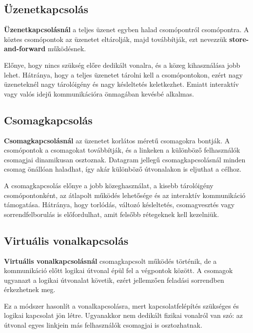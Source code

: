 \subsection{Üzenetkapcsolás}

\textbf{Üzenetkapcsolásnál} a teljes üzenet egyben halad csomópontról csomópontra. A köztes csomópontok az üzenetet eltárolják, majd továbbítják, ezt nevezzük \textbf{store-and-forward} működésnek.

Előnye, hogy nincs szükség előre dedikált vonalra, és a közeg kihasználása jobb lehet. Hátránya, hogy a teljes üzenetet tárolni kell a csomópontokon, ezért nagy üzeneteknél nagy tárolóigény és nagy késleltetés keletkezhet. Emiatt interaktív vagy valós idejű kommunikációra önmagában kevésbé alkalmas.

\subsection{Csomagkapcsolás}

\textbf{Csomagkapcsolásnál} az üzenetet korlátos méretű csomagokra bontják. A csomópontok a csomagokat továbbítják, és a linkeken a különböző felhasználók csomagjai dinamikusan osztoznak. Datagram jellegű csomagkapcsolásnál minden csomag önállóan haladhat, így akár különböző útvonalakon is eljuthat a célhoz.

A csomagkapcsolás előnye a jobb közeghasználat, a kisebb tárolóigény csomópontonként, az átlapolt működés lehetősége és az interaktív kommunikáció támogatása. Hátránya, hogy torlódás, változó késleltetés, csomagvesztés vagy sorrendfelborulás is előfordulhat, amit felsőbb rétegeknek kell kezelniük.

\subsection{Virtuális vonalkapcsolás}

\textbf{Virtuális vonalkapcsolásnál} csomagkapcsolt működés történik, de a kommunikáció előtt logikai útvonal épül fel a végpontok között. A csomagok ugyanazt a logikai útvonalat követik, ezért jellemzően feladási sorrendben érkezhetnek meg.

Ez a módszer hasonlít a vonalkapcsolásra, mert kapcsolatfelépítés szükséges és logikai kapcsolat jön létre. Ugyanakkor nem dedikált fizikai vonalról van szó: az útvonal egyes linkjein más felhasználók csomagjai is osztozhatnak.

\begin{center}

\end{center}

